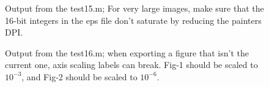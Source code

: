 \documentclass[a4paper,11pt]{article}
\begin{document}
     \begin{figure}[ht]
       \centering
       \caption{Output from the {\ttfamily test15.m}; For very large images, make sure that the
         16-bit integers in the eps file don't saturate by reducing the painters DPI.}
     \end{figure}
     \begin{figure}[ht]
       \centering
       \quad
       \caption{Output from the {\ttfamily test16.m}; when exporting a figure that isn't the
         current one, axis scaling labels can break. Fig-1 should be scaled to $10^{-3}$, and
         Fig-2 should be scaled to $10^{-6}$.}
     \end{figure}
\end{document}
